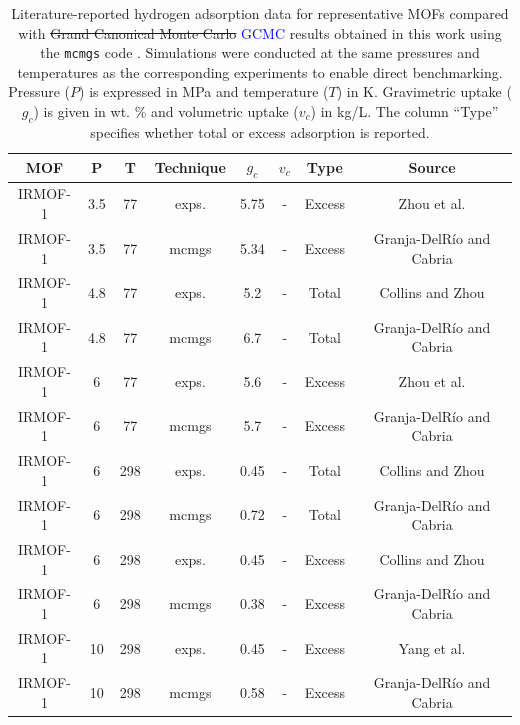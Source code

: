 \documentclass[review]{elsarticle}
\begin{document}
\begin{table}[H]
\begin{center}
\caption{\noindent
\label{comparisonH2}
Literature-reported hydrogen adsorption data for representative MOFs compared 
with \sout{Grand Canonical Monte Carlo} \textcolor{blue}{GCMC} results obtained 
in this work using the \texttt{mcmgs} code \cite{mcmgs}. Simulations were 
conducted at the same pressures and temperatures as the corresponding 
experiments to enable direct benchmarking. Pressure ($P$) is expressed in MPa 
and temperature ($T$) in K. Gravimetric uptake ($g_c$) is given in wt. \% and 
volumetric uptake ($v_c$) in kg/L. The column ``Type'' specifies whether total 
or excess adsorption is reported.
}
\bigskip
\begin{tabular}{cccccccc}
\hline
MOF          &  P   &  T  & Technique & $g_c$ & $v_c$  & Type   & Source \\
\hline
			IRMOF-1      &  3.5 &  77 & exps.     &  5.75 &      - & Excess & Zhou et al. \cite{zwhy07} \\
			IRMOF-1      &  3.5 &  77 & mcmgs     &  5.34 &      - & Excess & Granja-DelRío and Cabria \cite{gc24b} \\
			IRMOF-1      &  4.8 &  77 & exps.     &  5.2  &      - & Total  & Collins and Zhou \cite{cz07} \\
			IRMOF-1      &  4.8 &  77 & mcmgs     &  6.7  &      - & Total  & Granja-DelRío and Cabria \cite{gc24b} \\
			IRMOF-1      &  6   &  77 & exps.     &  5.6  &	     - & Excess & Zhou et al. \cite{zwhy07} \\
			IRMOF-1      &  6   &  77 & mcmgs     &  5.7  &	     - & Excess & Granja-DelRío and Cabria \cite{gc24b} \\
			IRMOF-1      &  6   & 298 & exps.     &  0.45 &	     - & Total  & Collins and Zhou \cite{cz07} \\
			IRMOF-1      &  6   & 298 & mcmgs     &  0.72 &	     - & Total  & Granja-DelRío and Cabria \cite{gc24b} \\
			IRMOF-1      &  6   & 298 & exps.     &  0.45 &      - & Excess & Collins and Zhou\cite{cz07} \\
			IRMOF-1      &  6   & 298 & mcmgs     &  0.38 &      - & Excess & Granja-DelRío and Cabria \cite{gc24c} \\
			IRMOF-1      & 10   & 298 & exps.     &  0.45 &	     - & Excess & Yang et al. \cite{yki+12} \\
			IRMOF-1      & 10   & 298 & mcmgs     &  0.58 &      - & Excess & Granja-DelRío and Cabria \cite{gc24c}\\

\end{tabular}
\end{center}
\end{table}
\end{document}
